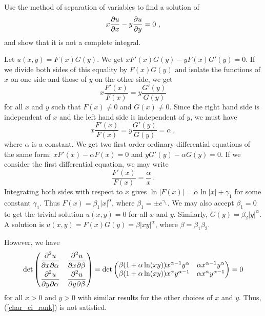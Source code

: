 \begin{egg}
Use the method of separation of variables to find a solution of
\[
x\pdydx{u}{x} - y\pdydx{u}{y} = 0 \ ,
\]
and show that it is not a complete integral.

Let $u(x,y) = F(x)G(y)$.  We get $xF'(x) G(y) - y F(x) G'(y) = 0$.  If we
divide both sides of this equality by $F(x)G(y)$ and isolate the
functions of $x$ on one side and those of $y$ on the other side, we
get
\[
x\frac{F'(x)}{F(x)} = y\frac{G'(y)}{G(y)}
\]
for all $x$ and $y$ such that $F(x) \neq 0$ and $G(x) \neq 0$.  Since
the right hand side is independent of $x$ and the left hand side is
independent of $y$, we must have
\[
x \frac{F'(x)}{F(x)} = y \frac{G'(y)}{G(y)} = \alpha \ ,
\]
where $\alpha$ is a constant.  We get two first order ordinary
differential equations of the same form:
$x F'(x) - \alpha F(x) = 0$ and $y G'(y) - \alpha G(y) = 0$.
If we consider the first differential equation, we may write
\[
\frac{F'(x)}{F(x)} = \frac{\alpha}{x} \ .
\]
Integrating both sides with respect to $x$ gives
$\ln|F(x)| = \alpha \ln|x| + \gamma_1$
for some constant $\gamma_1$.  Thus
$\displaystyle F(x) = \beta_1 |x|^\alpha$, where
$\displaystyle \beta_1 = \pm e^{\gamma_1}$.  We may also accept
$\beta_1 = 0$ to get
the trivial solution $u(x,y)=0$ for all $x$ and $y$.  Similarly,
$\displaystyle G(y) = \beta_2 |y|^\alpha$.   A solution is
$u(x,y) = F(x)G(y) = \beta |xy|^{\alpha}$, where
$\beta = \beta_1 \beta_2$.

However, we have
\[
\det
\begin{pmatrix}
\displaystyle \pdydxnm{u}{x}{\alpha}{2}{}{} &
\displaystyle \pdydxnm{u}{x}{\beta}{2}{}{} \\[0.7em]
\displaystyle \pdydxnm{u}{y}{\alpha}{2}{}{} &
\displaystyle \pdydxnm{u}{y}{\beta}{2}{}{}
\end{pmatrix}
= \det
\begin{pmatrix}
\beta (1+\alpha\ln(x y)) x^{\alpha-1}y^\alpha &
\alpha x^{\alpha-1}y^\alpha \\
\beta (1+\alpha\ln(x y)) x^\alpha y^{\alpha-1} &
\alpha x^\alpha y^{\alpha-1}
\end{pmatrix} = 0
\]
for all $x > 0$ and $y > 0$ with similar results for the other
choices of $x$ and $y$.   Thus, (\ref{char_ci_rank}) is not
satisfied.
\end{egg}


